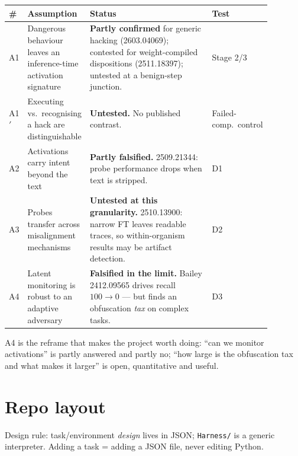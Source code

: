 \documentclass[11pt,a4paper]{article}
\begin{document}
\begin{center}\small
\begin{tabular}{@{}p{0.035\linewidth}p{0.235\linewidth}p{0.50\linewidth}p{0.115\linewidth}@{}}
\toprule
\textbf{\#} & \textbf{Assumption} & \textbf{Status} & \textbf{Test}\\
\midrule
A1 & Dangerous behaviour leaves an inference-time activation signature &
\textbf{Partly confirmed} for generic hacking (2603.04069); contested for weight-compiled
dispositions (2511.18397); untested at a benign-step junction. & Stage 2/3\\
A1$'$ & Executing vs.\ recognising a hack are distinguishable &
\textbf{Untested.} No published contrast. & Failed-comp.\ control\\
A2 & Activations carry intent beyond the text &
\textbf{Partly falsified.} 2509.21344: probe performance drops when text is stripped. & D1\\
A3 & Probes transfer across misalignment mechanisms &
\textbf{Untested at this granularity.} 2510.13900: narrow FT leaves readable traces, so
within-organism results may be artifact detection. & D2\\
A4 & Latent monitoring is robust to an adaptive adversary &
\textbf{Falsified in the limit.} Bailey 2412.09565 drives recall $100\to0$ --- but finds an
obfuscation \emph{tax} on complex tasks. & D3\\
\bottomrule
\end{tabular}
\end{center}

A4 is the reframe that makes the project worth doing: ``can we monitor activations'' is
partly answered and partly no; ``how large is the obfuscation tax and what makes it larger'' is
open, quantitative and useful.

\section{Repo layout}

Design rule: task/environment \emph{design} lives in JSON; \texttt{Harness/} is a generic
interpreter. Adding a task = adding a JSON file, never editing Python.
\end{document}
